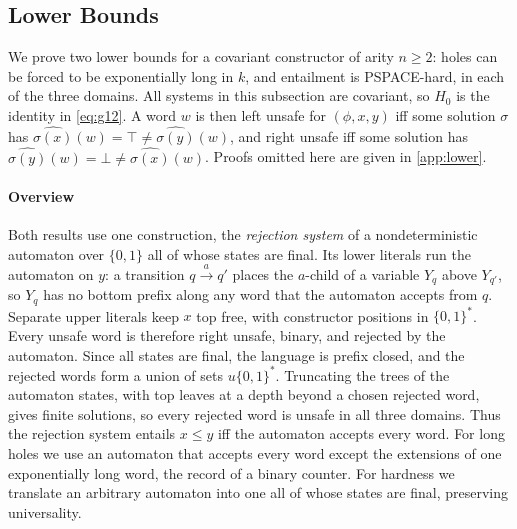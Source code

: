 
\subsection{Lower Bounds}
\label{sec:complexity-lower}

We prove two lower bounds for a covariant constructor of arity $n\ge2$:
holes can be forced to be exponentially long in $k$, and entailment is
PSPACE-hard, in each of the three domains.
All systems in this subsection are covariant, so $H_0$ is the identity in
\eqref{eq:g12}. A word $w$ is then left unsafe for $(\phi,x,y)$ iff some
solution $\sigma$ has $\widehat{\sigma(x)}(w)=\top\ne\widehat{\sigma(y)}(w)$,
and right unsafe iff some solution has
$\widehat{\sigma(y)}(w)=\bot\ne\widehat{\sigma(x)}(w)$. Proofs omitted here
are given in \cref{app:lower}.

\paragraph{Overview}
Both results use one construction, the \emph{rejection system} of a
nondeterministic automaton over $\{0,1\}$ all of whose states are final.
Its lower literals run the automaton on $y$: a transition
$q\xrightarrow{a}q'$ places the $a$-child of a variable $Y_q$ above
$Y_{q'}$, so $Y_q$ has no bottom prefix along any word that the automaton
accepts from $q$. Separate upper literals keep $x$ top free, with constructor
positions in $\{0,1\}^*$. Every unsafe word is therefore right unsafe, binary,
and rejected by the automaton. Since all states are final, the language is
prefix closed, and the rejected words form a union of sets $u\{0,1\}^*$.
Truncating the trees of the automaton states, with top leaves at a depth
beyond a chosen rejected word, gives finite solutions, so every rejected word
is unsafe in all three domains. Thus the rejection system entails $x\le y$ iff
the automaton accepts every word. For long holes we use an automaton that
accepts every word except the extensions of one exponentially long word, the
record of a binary counter. For hardness we translate an arbitrary automaton
into one all of whose states are final, preserving universality.

